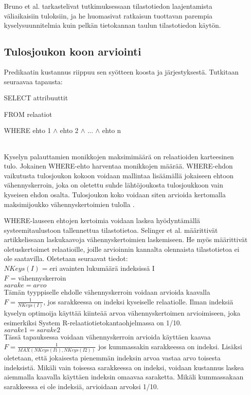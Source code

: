 \documentclass[finnish]{tktltiki2}
\theoremstyle{definition}
\theoremstyle{remark}
\begin{document}
Bruno et al. tarkastelivat tutkimuksessaan \cite{bruno2002exploiting} tilastotiedon laajentamista väliaikaisiin tuloksiin, ja he huomasivat ratkaisun tuottavan parempia kyselysuunnitelmia kuin pelkän tietokannan taulun tilastotiedon käytön.

\subsection{Tulosjoukon koon arviointi}
Predikaatin kustannus riippuu sen syötteen koosta ja järjestyksestä. Tutkitaan seuraavaa tapausta:
\newline

\begin{frame}

SELECT attribuuttit

FROM relaatiot

WHERE ehto 1 $\wedge$ ehto 2 $\wedge$ ... $\wedge$ ehto n
\end{frame}
\\\newline
Kyselyn palauttamien monikkojen maksimimäärä on relaatioiden karteesinen tulo. Jokainen WHERE-ehto harventaa monikkojen määrää. WHERE-ehdon vaikutusta tulosjoukon kokoon voidaan mallintaa lisäämällä jokaiseen ehtoon vähennyskerroin, joka on oletettu suhde lähtöjoukosta tulosjoukkoon vain kyseisen ehdon osalta. 
Tulosjoukon koko voidaan siten arvioida kertomalla maksimijoukko vähennyskertoimien tulolla \cite{ramakrishnan2003database}. 

WHERE-lauseen ehtojen kertoimia voidaan laskea hyödyntämällä systeemitaulustoon tallennettua tilastotietoa. Selinger et al. määrittivät artikkelissaan \cite{selinger1979access} laskukaavoja vähennyskertoimien laskemiseen. He myös määrittivät oletuskertoimet relaatioille, joille arvioinnin kannalta olennaista tilastotietoa ei ole saatavilla. Oletetaan seuraavat tiedot:
\\\newline
$NKeys(I)$ = eri avainten lukumäärä indeksissä I
\\
$F$ = vähennyskerroin
\\\newline
$sarake = arvo$ 
\\
Tämän tyyppiselle ehdolle vähennyskerroin voidaan arvioida kaavalla $F = \frac{1}{NKeys(I)}$, jos sarakkeessa on indeksi kyseiselle relaatiolle. \cite{selinger1979access} Ilman indeksiä kyselyn optimoija käyttää kiinteää arvoa vähennyskertoimen arvioimiseen, joka esimerkiksi System R-relaatiotietokantaohjelmassa on 1/10.
\\\newline
$sarake1 = sarake2$ 
\\
Tässä tapauksessa voidaan vähennyskerroin arvioida käyttäen kaavaa $F = \frac{1}{MAX (NKeys(I1), NKeys(I2))}$ jos kummassakin sarakkeessa on indeksi. Lisäksi oletetaan, että jokaisesta pienemmän indeksin arvoa vastaa arvo toisesta indeksistä. Mikäli vain toisessa sarakkeessa on indeksi, 
voidaan kustannus laskea aiemmalla kaavalla käyttäen indeksin omaavaa saraketta. Mikäli kummassakaan sarakkeessa ei ole indeksiä, arvioidaan arvoksi 1/10.
\end{document}
